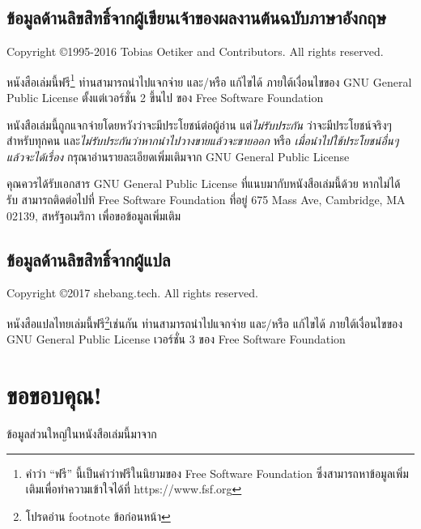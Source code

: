 \section*{ข้อมูลด้านลิขสิทธิ์จากผู้เขียนเจ้าของผลงานต้นฉบับภาษาอังกฤษ}

Copyright \copyright 1995-2016 Tobias Oetiker and
Contributors.  All rights reserved.

หนังสือเล่มนี้ฟรี\footnote{คำว่า ``ฟรี'' นี้เป็นคำว่าฟรีในนิยามของ Free Software
Foundation ซึ่งสามารถหาข้อมูลเพิ่มเติมเพื่อทำความเข้าใจได้ที่ https://www.fsf.org}
ท่านสามารถนำไปแจกจ่าย และ/หรือ แก้ไขได้ ภายใต้เงื่อนไขของ GNU General Public
License ตั้งแต่เวอร์ชั่น 2 ขึ้นไป ของ Free Software Foundation 

หนังสือเล่มนี้ถูกแจกจ่ายโดยหวังว่าจะมีประโยชน์ต่อผู้อ่าน แต่\emph{ไม่รับประกัน}
ว่าจะมีประโยชน์จริงๆสำหรับทุกคน และ\emph{ไม่รับประกันว่าหากนำไปวางขายแล้วจะขายออก}
หรือ \emph{เมื่อนำไปใช้ประโยชน์อื่นๆแล้วจะได้เรื่อง} กรุณาอ่านรายละเอียดเพิ่มเติมจาก GNU
General Public License

คุณควรได้รับเอกสาร GNU General Public License ที่แนบมากับหนังสือเล่มนี้ด้วย หากไม่ได้
รับ สามารถติดต่อไปที่ Free Software Foundation ที่อยู่ 675 Mass Ave, Cambridge,
MA 02139, สหรัฐอเมริกา เพื่อขอข้อมูลเพิ่มเติม

\section*{ข้อมูลด้านลิขสิทธิ์จากผู้แปล}

Copyright \copyright 2017 shebang.tech.  All rights reserved.

หนังสือแปลไทยเล่มนี้ฟรี\footnote{โปรดอ่าน footnote ข้อก่อนหน้า}เช่นกัน
ท่านสามารถนำไปแจกจ่าย และ/หรือ แก้ไขได้ ภายใต้เงื่อนไขของ GNU General Public
License เวอร์ชั่น 3 ของ Free Software Foundation

\chapter{ขอขอบคุณ!}

ข้อมูลส่วนใหญ่ในหนังสือเล่มนี้มาจาก

\shbtoaddmoretranslation
